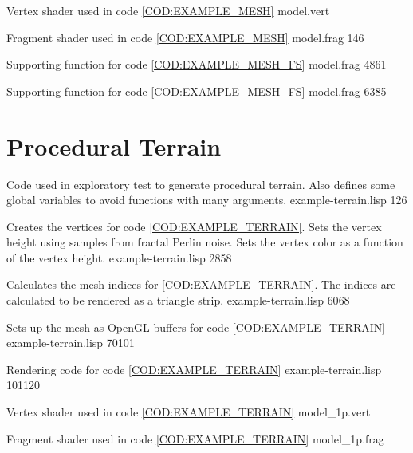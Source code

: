       {Vertex shader used in code \ref{COD:EXAMPLE_MESH}}
      {model.vert}
      {}{}{}
         
      {Fragment shader used in code \ref{COD:EXAMPLE_MESH}}
      {model.frag}
      {1}{46}{}

      {Supporting function for code \ref{COD:EXAMPLE_MESH_FS}}
      {model.frag}
      {48}{61}{}

      {Supporting function for code \ref{COD:EXAMPLE_MESH_FS}}
      {model.frag}
      {63}{85}{}

\section{Procedural Terrain}

\label{APP:TERRAIN}

         {Code used in exploratory test to generate procedural terrain.
           Also defines some global variables to avoid functions with many arguments.}
         {example-terrain.lisp}
         {1}{26}{}

         {Creates the vertices for code \ref{COD:EXAMPLE_TERRAIN}.
           Sets the vertex height using samples from fractal Perlin noise.
           Sets the vertex color as a function of the vertex height.}
         {example-terrain.lisp}
         {28}{58}{}

         {Calculates the mesh indices for \ref{COD:EXAMPLE_TERRAIN}.
           The indices are calculated to be rendered as a triangle strip.}
         {example-terrain.lisp}
         {60}{68}{}

         {Sets up the mesh as OpenGL buffers for code \ref{COD:EXAMPLE_TERRAIN}}
         {example-terrain.lisp}
         {70}{101}{}

         {Rendering code for code \ref{COD:EXAMPLE_TERRAIN}}
         {example-terrain.lisp}
         {101}{120}{}

      {Vertex shader used in code \ref{COD:EXAMPLE_TERRAIN}}
      {model_1p.vert}
      {}{}{}
         
      {Fragment shader used in code \ref{COD:EXAMPLE_TERRAIN}}
      {model_1p.frag}
      {}{}{}
